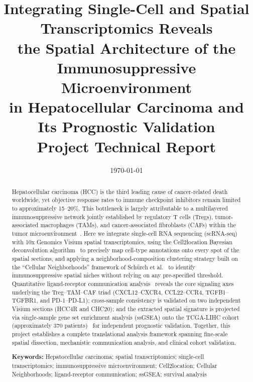 \documentclass[12pt, a4paper]{article}
\title{
    \vspace{-1cm}
    \textbf{Integrating Single-Cell and Spatial Transcriptomics Reveals\\
    the Spatial Architecture of the Immunosuppressive Microenvironment\\
    in Hepatocellular Carcinoma and Its Prognostic Validation}\\[0.5em]
    \large Project Technical Report
}
\author{}
\date{\today}
\begin{document}
\maketitle
\thispagestyle{empty}

\begin{abstract}

Hepatocellular carcinoma (HCC) is the third leading cause of cancer-related death worldwide, yet objective response rates to immune checkpoint inhibitors remain limited to approximately 15--20\%. This bottleneck is largely attributable to a multilayered immunosuppressive network jointly established by regulatory T cells (Tregs), tumor-associated macrophages (TAMs), and cancer-associated fibroblasts (CAFs) within the tumor microenvironment~\citep{llovet2021hepatocellular,finn2020atezolizumab}. Here we integrate single-cell RNA sequencing (scRNA-seq) with 10x Genomics Visium spatial transcriptomics, using the Cell2location Bayesian deconvolution algorithm~\citep{kleshchevnikov2022cell2location} to precisely map cell-type annotations onto every spot of the spatial sections, and applying a neighborhood-composition clustering strategy built on the ``Cellular Neighborhoods'' framework of Schürch et al.~\citep{schurch2020coordinated} to identify immunosuppressive spatial niches without relying on any pre-specified threshold. Quantitative ligand-receptor communication analysis~\citep{efremova2020cellphonedb} reveals the core signaling axes underlying the Treg--TAM--CAF triad (CXCL12--CXCR4, CCL22--CCR4, TGFB1--TGFBR1, and PD-1--PD-L1); cross-sample consistency is validated on two independent Visium sections (HCC4R and CHC20); and the extracted spatial signature is projected via single-sample gene set enrichment analysis (ssGSEA) onto the TCGA-LIHC cohort (approximately 370 patients)~\citep{tomczak2015cancer} for independent prognostic validation. Together, this project establishes a complete translational analysis framework spanning fine-scale spatial dissection, mechanistic communication analysis, and clinical cohort validation.

\noindent\textbf{Keywords:}
Hepatocellular carcinoma; spatial transcriptomics; single-cell transcriptomics; immunosuppressive microenvironment; Cell2location; Cellular Neighborhoods; ligand-receptor communication; ssGSEA; survival analysis
\end{abstract}

\newpage
\tableofcontents
\newpage

\end{document}
